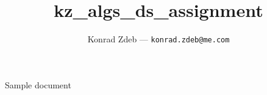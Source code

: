 \documentclass[12pt]{article}
\title{
	kz_algs_ds_assignment
}
\author{
	Konrad Zdeb --- \texttt{konrad.zdeb@me.com}
}
\begin{document}
Sample document
\end{document}
